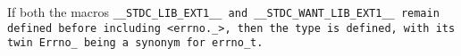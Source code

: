 If both the macros \tt{__STDC_LIB_EXT1__} and \tt{__STDC_WANT_LIB_EXT1__}
remain defined before including \tt{<errno._>}, then the type 
is defined, with its twin \tt{Errno_} being a synonym for \tt{errno_t}.
